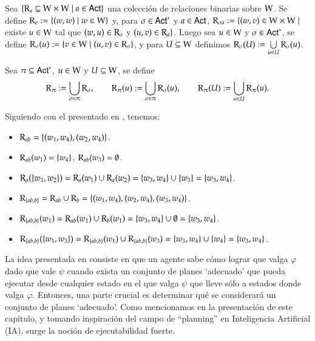 \begin{definicion}
    Sea $\{\mathrm{R}_a \subseteq \mathrm{W} \times \mathrm{W} \mid a \in {\rm \sf Act}\}$ una colección de relaciones binarias sobre $\mathrm{W}$. 
    Se define $\mathrm{R}_\epsilon := \{(w,w) \mid w \in \mathrm{W}\}$ y, para $\sigma \in {\rm \sf Act}^*$ y $a \in {\rm \sf Act}$, 
    $\mathrm{R}_{\sigma a} := \{(w,v) \in \mathrm{W} \times \mathrm{W} \mid$ existe $u \in \mathrm{W}$ tal que $(w,u) \in \mathrm{R}_\sigma$ y $(u,v) \in \mathrm{R}_a \}$. 
    Luego sea $u \in \mathrm{W}$ y $\sigma \in {\rm \sf Act}^*$, se define $\mathrm{R}_\sigma(u) := \{v\in\mathrm{W} \mid (u,v) \in \mathrm{R}_\sigma\}$, y para $U\subseteq\mathrm{W}$ 
    definimos $\mathrm{R}_\sigma(U) := \bigcup\limits_{u \in U} \mathrm{R}_\sigma(u)$.

    Sea $\pi \subseteq {\rm \sf Act}^*$, $u \in \mathrm{W}$ y $U \subseteq \mathrm{W}$, se define
    \[
        \mathrm{R}_\uppi := \bigcup_{\sigma \in \uppi} \mathrm{R}_{\sigma},
    \qquad
        \mathrm{R}_{\uppi}(u) := \bigcup_{\sigma \in \uppi} \mathrm{R}_\sigma(u),
    \qquad
        \mathrm{R}_{\uppi}(U) := \bigcup_{u \in U} \mathrm{R}_{\uppi}(u).
    \]
\end{definicion}

\begin{ejemplo}
    Siguiendo con el \ults presentado en , tenemos:
    \begin{itemize}
        \item $\mathrm{R}_{ab} = \{(w_1,w_4), (w_2, w_4)\}$.
        \item $\mathrm{R}_{ab}(w_1) = \{w_4\}$, \quad $\mathrm{R}_{ab}(w_3) = \emptyset$. 
        \item $\mathrm{R}_{a}(\{w_1,w_2\}) = \mathrm{R}_a(w_1) \cup \mathrm{R}_a(w_2) = \{w_3,w_4\} \cup \{w_3\} = \{w_3, w_4\}$.
        \item $\mathrm{R}_{\{ab,b\}} = \mathrm{R}_{ab} \cup \mathrm{R}_b = \{(w_1,w_4),(w_2,w_4),(w_3,w_4)\}$.
        \item $\mathrm{R}_{\{ab,b\}}(w_1) = \mathrm{R}_{ab}(w_1) \cup \mathrm{R}_b(w_1) = \{w_3,w_4\} \cup \emptyset = \{w_3,w_4\}$.
        \item $\mathrm{R}_{\{ab,b\}}(\{w_1,w_3\}) = \mathrm{R}_{\{ab,b\}}(w_1) \cup \mathrm{R}_{\{ab,b\}}(w_3) = \{w_3,w_4\} \cup \{w_4\} = \{w_3,w_4\}$.
    \end{itemize}
\end{ejemplo}


La idea presentada en \cite{ArecesFSV25,SaraviaPHD} consiste en que un agente sabe cómo lograr que valga $\varphi$ dado que vale $\psi$ cuando exista un 
conjunto de planes `adecuado' que pueda ejecutar desde cualquier estado en el que valga $\psi$ que lleve sólo a estados donde valga $\varphi$. 
Entonces, una parte crucial es determinar qué se considerará un conjunto de planes `adecuado'. Como mencionamos en la presentación de este capítulo, y tomando 
inspiración del campo de ``planning'' en Inteligencia Artificial (IA), surge la noción de ejecutabilidad fuerte.

